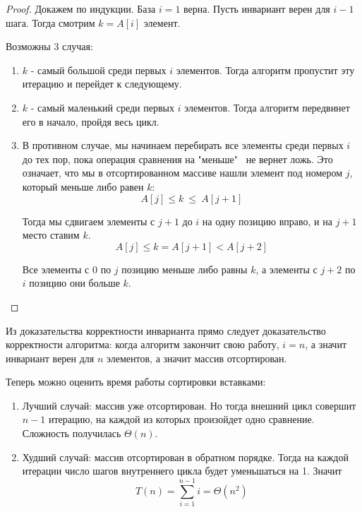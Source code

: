 \documentclass[../book.tex]{subfiles}
\begin{document}
	\begin{proof}
		
		Докажем по индукции. База $i = 1$ верна. Пусть инвариант верен для $i - 1$ шага. Тогда смотрим $k = A[i]$ элемент. 
		
		Возможны 3 случая:
		\begin{enumerate}
			\item $k$ - самый большой среди первых $i$ элементов. Тогда алгоритм пропустит эту итерацию и перейдет к следующему.
			
			\item $k$ - самый маленький среди первых $i$ элементов. Тогда алгоритм передвинет его в начало, пройдя весь цикл.
			
			\item В противном случае, мы начинаем перебирать все элементы среди первых $i$ до тех пор, пока операция сравнения на "меньше" \ не вернет ложь. Это означает, что мы в отсортированном массиве нашли элемент под номером $j$, который меньше либо равен $k$:
			\[
			A[j] \leqslant k \ \leqslant \ A[j+1] 
			\]
			
			Тогда мы сдвигаем элементы с $j+1$ до $i$ на одну позицию вправо, и на $j+1$ место ставим $k$.
			\[
			A[j] \leqslant k = A[j + 1] < A[j + 2]
			\]
			
			Все элементы с 0 по $j$ позицию меньше либо равны $k$, а элементы с $j+2$ по $i$ позицию они больше $k$.
		\end{enumerate}	
	\end{proof}
	
	Из доказательства корректности инварианта прямо следует доказательство корректности алгоритма: когда алгоритм закончит свою работу, $i = n$, а значит инвариант верен для $n$ элементов, а значит массив отсортирован.
	
	Теперь можно оценить время работы сортировки вставками:
	\begin{enumerate}
		\item Лучший случай: массив уже отсортирован. Но тогда внешний цикл совершит $n - 1$ итерацию, на каждой из которых произойдет одно сравнение. Сложность получилась $\Theta(n)$.
		
		\item Худший случай: массив отсортирован в обратном порядке. Тогда на каждой итерации число шагов внутреннего цикла будет уменьшаться на 1. Значит 
		\[
		T(n) = \sum_{i = 1}^{n - 1}i = \Theta(n^2)
		\]
	\end{enumerate}
	
	\pagebreak
\end{document}
